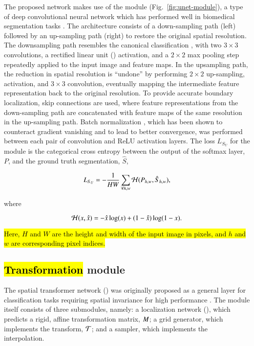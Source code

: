 The proposed network makes use of the \UNet{} module (Fig.~\ref{fig:unet-module}), a type of deep convolutional neural network which has performed well in biomedical segmentation tasks \citep{Long2015,Ronneberger2015,Xie2015}.
The \UNet{} architecture consists of a down-sampling path (left) followed by an up-sampling path (right) to restore the original spatial resolution.
The downsampling path resembles the canonical classification \CNN{} \citep{Krizhevsky2012,Simonyan2015}, with two $3 \times 3$ convolutions, a rectified linear unit (\ReLU{}) activation, 
and a $2 \times 2$ max pooling step repeatedly applied to the input image and feature maps.  
In the upsampling path, the reduction in spatial resolution is ``undone'' by performing $2 \times 2$ up-sampling, \ReLU{} activation, and $3 \times 3$ convolution, eventually mapping the intermediate feature representation back to the original resolution.
To provide accurate boundary localization, skip connections are used, where feature representations from the down-sampling path are concatenated with feature maps of the same resolution in the up-sampling path.
Batch normalization \mbox{\citep{Ioffe2015}}, which has been shown to counteract gradient vanishing and to lead to better convergence, was performed between each pair of convolution and ReLU activation layers.
The loss $L_{S_U}$ for the \UNet{} module is the categorical cross entropy between the output of the softmax layer, $P$, and the ground truth segmentation, $\hat{S}$,

\begin{equation}\label{eqn:unet-loss}
L_{S_U} = -\frac{1}{HW} \sum_{\forall h,w} \mathcal{H}(P_{h,w}, \hat{S}_{h,w}),
\end{equation}

\noindent where

\begin{equation}\label{eqn:cross-entropy}
\mathcal{H}(x, \hat{x}) = - \hat{x} \log(x) + (1 - \hat{x}) \log(1 - x).
\end{equation}

\hl{
Here, $H$ and $W$ are the height and width of the input image in pixels, and $h$ and $w$ are corresponding pixel indices.
}

\subsection{\hl{Transformation} module}\label{sec:stn}



The spatial transformer network (\STN{}) was originally proposed as a general layer for classification tasks requiring spatial invariance for high performance \hl{\citep{Jaderberg2015}}.
The \STN{} module itself consists of three submodules, namely: a localization network (\LocNet{}), which predicts a rigid, affine transformation matrix, $M$; a grid generator, which implements the transform, $\mathcal{T}$; and a sampler, which implements the interpolation.

